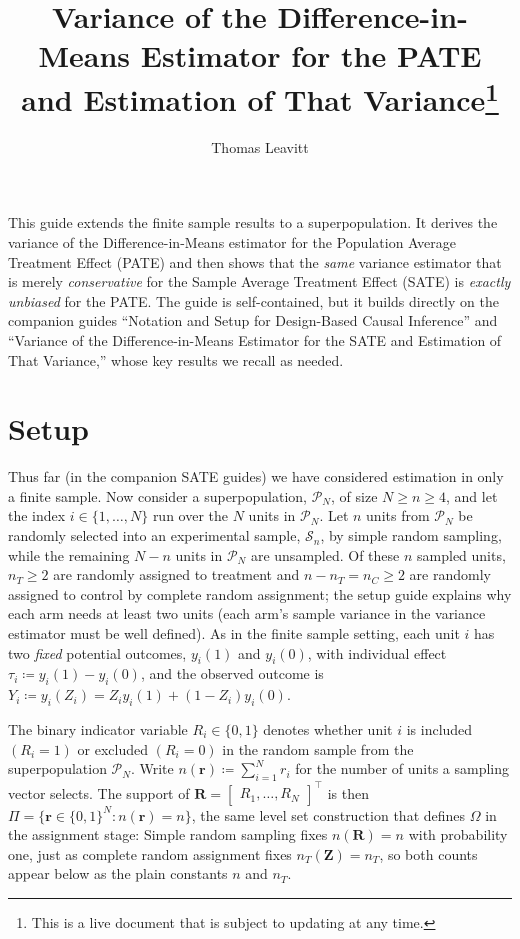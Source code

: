 \documentclass[12pt,leqno]{article}
\theoremstyle{newstyle}
\newcommand{\bZ}{\bm{Z}}   \newcommand{\bz}{\bm{z}}   %
\newcommand{\bR}{\bm{R}}   \newcommand{\br}{\bm{r}}   %
\newcommand{\po}[2]{y_{#1}(#2)}     %
\begin{document}
\title{Variance of the Difference-in-Means Estimator for the PATE and Estimation of That Variance\thanks{This is a live document that is subject to updating at any time.}}
\author{Thomas Leavitt}
\date{}
\maketitle

This guide extends the finite sample results to a superpopulation. It derives the variance of the Difference-in-Means estimator for the Population Average Treatment Effect (PATE) and then shows that the \textit{same} variance estimator that is merely \textit{conservative} for the Sample Average Treatment Effect (SATE) is \textit{exactly unbiased} for the PATE. The guide is self-contained, but it builds directly on the companion guides \enquote{Notation and Setup for Design-Based Causal Inference} and \enquote{Variance of the Difference-in-Means Estimator for the SATE and Estimation of That Variance,} whose key results we recall as needed.

\section{Setup}

Thus far (in the companion SATE guides) we have considered estimation in only a finite sample. Now consider a superpopulation, $\mathcal{P}_N$, of size $N \geq n \geq 4$, and let the index $i \in \{1, \ldots , N\}$ run over the $N$ units in $\mathcal{P}_N$. Let $n$ units from $\mathcal{P}_N$ be randomly selected into an experimental sample, $\mathcal{S}_n$, by simple random sampling, while the remaining $N - n$ units in $\mathcal{P}_N$ are unsampled. Of these $n$ sampled units, $n_T \geq 2$ are randomly assigned to treatment and $n - n_T = n_C \geq 2$ are randomly assigned to control by complete random assignment; the setup guide explains why each arm needs at least two units (each arm's sample variance in the variance estimator must be well defined). As in the finite sample setting, each unit $i$ has two \textit{fixed} potential outcomes, $\po{i}{1}$ and $\po{i}{0}$, with individual effect $\tau_i \coloneqq \po{i}{1} - \po{i}{0}$, and the observed outcome is $Y_i \coloneqq \po{i}{Z_i} = Z_i \po{i}{1} + (1 - Z_i)\po{i}{0}$.

The binary indicator variable $R_i \in \{0, 1\}$ denotes whether unit $i$ is included $(R_i = 1)$ or excluded $(R_i = 0)$ in the random sample from the superpopulation $\mathcal{P}_N$. Write $n(\br) \coloneqq \sum_{i = 1}^N r_i$ for the number of units a sampling vector selects. The support of $\bR = \begin{bmatrix} R_1, \dots , R_N\end{bmatrix}^\top$ is then $\Pi = \{\br \in \{0,1\}^N: n(\br) = n\}$, the same level set construction that defines $\Omega$ in the assignment stage: Simple random sampling fixes $n(\bR) = n$ with probability one, just as complete random assignment fixes $n_T(\bZ) = n_T$, so both counts appear below as the plain constants $n$ and $n_T$.
\end{document}
